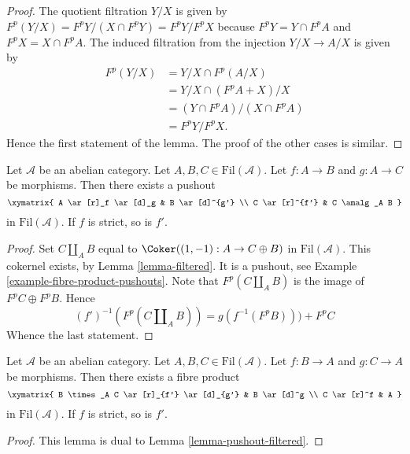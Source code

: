 \begin{proof}
The quotient filtration $Y/X$ is given by
$F^p(Y/X) = F^pY/(X \cap F^pY) = F^pY/F^pX$
because $F^pY = Y \cap F^pA$ and $F^pX = X \cap F^pA$.
The induced filtration from the injection $Y/X \to A/X$ is given by
\begin{align*}
F^p(Y/X) & = Y/X \cap F^p(A/X) \\
& = Y/X \cap (F^pA + X)/X \\
& = (Y \cap F^pA)/(X \cap F^pA) \\
& = F^pY/F^pX.
\end{align*}
Hence the first statement of the lemma.
The proof of the other cases is similar.
\end{proof}

\begin{lemma}
\label{lemma-pushout-filtered}
Let $\mathcal{A}$ be an abelian category.
Let $A, B, C \in \text{Fil}(\mathcal{A})$.
Let $f : A \to B$ and $g : A \to C$ be morphisms.
Then there exists a pushout
$$
\xymatrix{
A \ar[r]_f \ar[d]_g & B \ar[d]^{g'} \\
C \ar[r]^{f'} & C \amalg_A B
}
$$
in $\text{Fil}(\mathcal{A})$. If $f$ is strict, so is $f'$.
\end{lemma}

\begin{proof}
Set $C \amalg_A B$ equal to $\Coker((1, -1) : A \to C \oplus B)$
in $\text{Fil}(\mathcal{A})$. This cokernel exists, by
Lemma \ref{lemma-filtered}.
It is a pushout, see
Example \ref{example-fibre-product-pushouts}.
Note that $F^p(C \amalg_A B)$ is the image of $F^pC \oplus F^pB$.
Hence
$$
(f')^{-1}(F^p(C \amalg_A B)) = g(f^{-1}(F^pB))) + F^pC
$$
Whence the last statement.
\end{proof}

\begin{lemma}
\label{lemma-fibre-product-filtered}
Let $\mathcal{A}$ be an abelian category.
Let $A, B, C \in \text{Fil}(\mathcal{A})$.
Let $f : B \to A$ and $g : C \to A$ be morphisms.
Then there exists a fibre product
$$
\xymatrix{
B \times_A C \ar[r]_{f'} \ar[d]_{g'} & B \ar[d]^g \\
C \ar[r]^f & A
}
$$
in $\text{Fil}(\mathcal{A})$. If $f$ is strict, so is $f'$.
\end{lemma}

\begin{proof}
This lemma is dual to
Lemma \ref{lemma-pushout-filtered}.
\end{proof}

